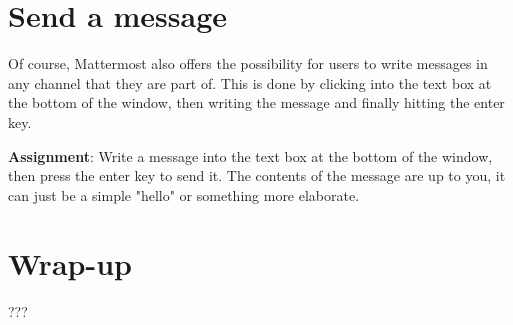 \documentclass[paper=a4, fontsize=11pt]{scrartcl} %
\numberwithin{equation}{section} %
\numberwithin{figure}{section} %
\numberwithin{table}{section} %
\begin{document}
\section{Send a message}
\label{task4}

Of course, Mattermost also offers the possibility for users to write messages in any channel that they are part of.
This is done by clicking into the text box at the bottom of the window, then writing the message and finally hitting the enter key.

\textbf{Assignment}: Write a message into the text box at the bottom of the window, then press the enter key to send it.
The contents of the message are up to you, it can just be a simple "hello" or something more elaborate.


\section{Wrap-up}
\label{wrapup}

???

%
%
%
%
%

\end{document}
